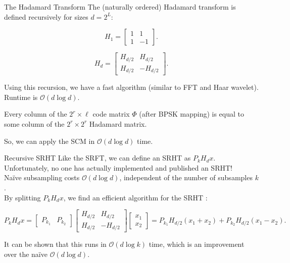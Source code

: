 \documentclass[9pt]{beamer}
\begin{document}
\begin{frame}{The Hadamard Transform}
   The (naturally ordered) Hadamard transform is defined recursively for sizes $d=2^L$:

   \[ H_1 = \begin{bmatrix}1 &1\\1&-1\end{bmatrix}. \] 
   
   \[ H_d = \begin{bmatrix} H_{d/2} & H_{d/2}\\H_{d/2} & -H_{d/2}\end{bmatrix}. \] 
   
   \noindent Using this recursion, we have a fast algorithm (similar to FFT and Haar wavelet).\\
   \noindent Runtime is $\mathcal{O}(d\log d)$.\\[2em]
   
   \begin{theorem}
      Every column of the $2^r\times \ell$ code matrix $\Phi$ (after BPSK mapping) is equal to some column of the $2^r\times 2^r$ Hadamard matrix.
   \end{theorem}
   
   So, we can apply the SCM in $\mathcal{O}(d\log d)$ time.
\end{frame}

\begin{frame}{Recursive SRHT}
   Like the SRFT, we can define an SRHT as $P_kH_dx$.  Unfortunately, no one has actually implemented and published an SRHT!\\
   \noindent Na\"ive subsampling costs $\mathcal{O}(d\log d)$, independent of the number of subsamples $k$.\\[2em]


   By splitting $P_kH_dx$, we find an efficient algorithm for the SRHT \cite{ailon2009fast}:

   \[ P_kH_dx = \begin{bmatrix}P_{k_1}&P_{k_2}\end{bmatrix}\begin{bmatrix}H_{d/2}&H_{d/2}\\H_{d/2}&-H_{d/2}\end{bmatrix}\begin{bmatrix}x_1\\x_2\end{bmatrix} = P_{k_1}H_{d/2}(x_1+x_2) + P_{k_2}H_{d/2}(x_1-x_2). \] 

   \noindent It can be shown that this runs in $\mathcal{O}(d\log k)$ time, which is an improvement over the na\"ive $\mathcal{O}(d\log d)$.

\end{frame}
\end{document}
